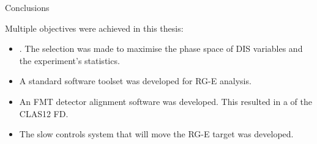 \begin{frame}{Conclusions}
    \label{12.31::conclusions}

    Multiple objectives were achieved in this thesis:

    \vspace{12pt}

    \begin{itemize}
        \item
            .
            The selection was made to maximise the phase space of DIS variables and the experiment's statistics.

        \vspace{6pt}
        \item
            A standard software toolset was developed for RG-E analysis.

        \vspace{6pt}
        \item
            An FMT detector alignment software was developed.
            This resulted in a  of the CLAS12 FD.

        \vspace{6pt}
        \item
            The slow controls system that will move the RG-E target was developed.
    \end{itemize}
\end{frame}

